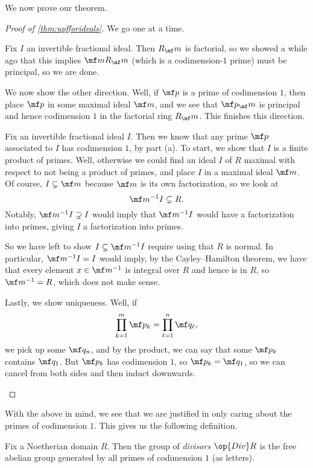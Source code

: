 We now prove our theorem.
\begin{proof}[Proof of \autoref{thm:upfforideals}]
	We go one at a time.
	\begin{listalph}
		\item Fix $I$ an invertible fractional ideal. Then $R_\mf m$ is factorial, so we showed a while ago that this implies $\mf mR_\mf m$ (which is a codimension-$1$ prime) must be principal, so we are done.

		We  now show the other direction. Well, if $\mf p$ is a prime of codimension $1$, then place $\mf p$ in some maximal ideal $\mf m$, and we see that $\mf p_\mf m$ is principal and hence codimension $1$ in the factorial ring $R_\mf m$. This finishes this direction.

		\item Fix an invertible fractional ideal $I$. Then we know that any prime $\mf p$ associated to $I$ has codimension $1$, by part (a). To start, we show that $I$ is a finite product of primes. Well, otherwise we could find an ideal $I$ of $R$ maximal with respect to not being a product of primes, and place $I$ in a maximal ideal $\mf m$. Of course, $I\subsetneq\mf m$ because $\mf m$ is its own factorization, so we look at
		\[\mf m^{-1}I\subsetneq R.\]
		Notably, $\mf m^{-1}I\supsetneq I$ would imply that $\mf m^{-1}I$ would have a factorization into primes, giving $I$ a factorization into primes.

		So we have left to show $I\subsetneq\mf m^{-1}I$ require using that $R$ is normal. In particular, $\mf m^{-1}I=I$ would imply, by the Cayley--Hamilton theorem, we have that every element $x\in\mf m^{-1}$ is integral over $R$ and hence is in $R$, so $\mf m^{-1}=R$, which does not make sense.

		Lastly, we show uniqueness. Well, if
		\[\prod_{k=1}^m\mf p_k=\prod_{\ell=1}^n\mf q_\ell,\]
		we pick up some $\mf q_n$, and by the product, we can say that some $\mf p_k$ contains $\mf q_1$. But $\mf p_k$ has codimension $1$, so $\mf p_k=\mf q_1$, so we can cancel from both sides and then induct downwards.
		\qedhere
	\end{listalph}
\end{proof}
With the above in mind, we see that we are justified in only caring about the primes of codimension $1$. This gives us the following definition.
\begin{definition}[Divisor]
	Fix a Noetherian domain $R$. Then the group of \textit{divisors} $\op{Div}R$ is the free abelian group generated by all primes of codimension $1$ (as letters).
\end{definition}
